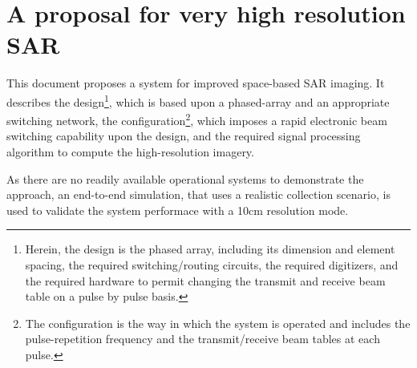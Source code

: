 \section{A proposal for very high resolution SAR}
This document proposes a system for improved space-based SAR imaging. It describes the design\footnote{Herein, the design is the phased array, including its dimension and element spacing, the required switching/routing circuits, the required digitizers, and the required hardware to permit changing the transmit and receive beam table on a pulse by pulse basis.}, which is based upon a phased-array and an appropriate switching network, the configuration\footnote{The configuration is the way in which the system is operated and includes the pulse-repetition frequency and the transmit/receive beam tables at each pulse.}, which imposes a rapid electronic beam switching capability upon the design, and the required signal processing algorithm to compute the high-resolution imagery.
\par
As there are no readily available operational systems to demonstrate the approach, an end-to-end simulation, that uses a realistic collection scenario, is used to validate the system performace with a 10cm resolution mode. 
